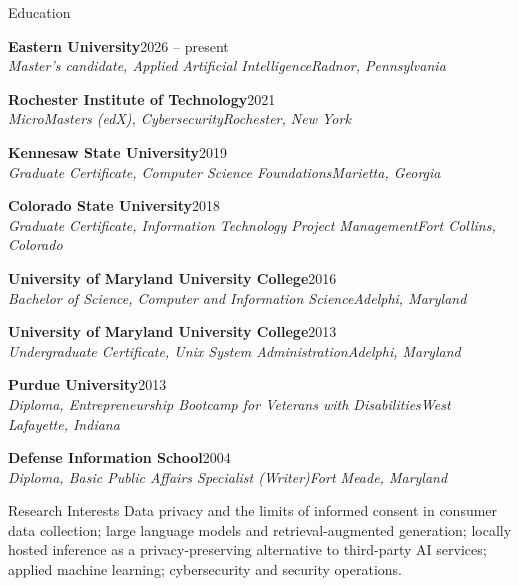 \documentclass{resume}
\newcommand{\cventry}[4]{%
  {\bf #1}\hfill{#2}\\
  {\em #3}\hfill{\em #4}\par\smallskip
}
\begin{document}

\begin{rSection}{Education}

\cventry{Eastern University}{2026 -- present}{Master's candidate, Applied Artificial Intelligence}{Radnor, Pennsylvania}

\cventry{Rochester Institute of Technology}{2021}{MicroMasters (edX), Cybersecurity}{Rochester, New York}

\cventry{Kennesaw State University}{2019}{Graduate Certificate, Computer Science Foundations}{Marietta, Georgia}

\cventry{Colorado State University}{2018}{Graduate Certificate, Information Technology Project Management}{Fort Collins, Colorado}

\cventry{University of Maryland University College}{2016}{Bachelor of Science, Computer and Information Science}{Adelphi, Maryland}

\cventry{University of Maryland University College}{2013}{Undergraduate Certificate, Unix System Administration}{Adelphi, Maryland}

\cventry{Purdue University}{2013}{Diploma, Entrepreneurship Bootcamp for Veterans with Disabilities}{West Lafayette, Indiana}

\cventry{Defense Information School}{2004}{Diploma, Basic Public Affairs Specialist (Writer)}{Fort Meade, Maryland}

\end{rSection}


\begin{rSection}{Research Interests}
Data privacy and the limits of informed consent in consumer data collection; large language models
and retrieval-augmented generation; locally hosted inference as a privacy-preserving alternative to
third-party AI services; applied machine learning; cybersecurity and security operations.
\end{rSection}

\end{document}
